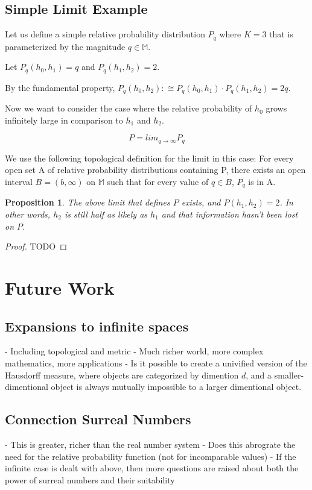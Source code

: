 \documentclass[twoside]{article}
\theoremstyle{plain}%
\newtheorem{proposition}[theorem]{Proposition}
\theoremstyle{definition}
\theoremstyle{remark}
\begin{document}
\subsection{Simple Limit Example}

Let us define a simple relative probability distribution \(P_q\) where \(K = 3\) that is parameterized by the magnitude \(q \in \mathbb{M}\).

Let \(P_q(h_0, h_1) = q\) and \(P_q(h_1, h_2) = 2\).

By the fundamental property, \(P_q(h_0, h_2) :\cong P_q(h_0, h_1) \cdot P_q(h_1, h_2) = 2q\).

Now we want to consider the case where the relative probability of \(h_0\) grows infinitely large in comparison to \(h_1\) and \(h_2\).

\[P = lim_{q \rightarrow \infty} P_q\]

We use the following topological definition for the limit in this case: For every open set A of relative probability distributions containing P, there exists an open interval \(B=(b, \infty)\) on \(\mathbb{M}\) such that for every value of \(q \in B\), \(P_q\) is in A.

\begin{proposition}
The above limit that defines \(P\) exists, and \(P(h_1, h_2) = 2\). In other words, \(h_2\) is still half as likely as \(h_1\) and that information hasn't been lost on \(P\).
\end{proposition}

\begin{proof}
TODO
\end{proof}

\section{Future Work}
\subsection{Expansions to infinite spaces}
- Including topological and metric
- Much richer world, more complex mathematics, more applications
- Is it possible to create a univified version of the Hausdorff measure, where objects are categorized by dimention \(d\), and a smaller-dimentional object is always mutually impossible to a larger dimentional object.
\subsection{Connection Surreal Numbers}
- This is greater, richer than the real number system
- Does this abrograte the need for the relative probability function (not for incomparable values)
- If the infinite case is dealt with above, then more questions are raised about both the power of surreal numbers and their suitability
\end{document}
